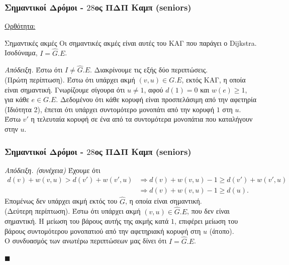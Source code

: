 \documentclass[t]{beamer}
\begin{document}
\begin{frame}
	\frametitle{Σημαντικοί Δρόμοι - $28$ος ΠΔΠ Καμπ (seniors)}
	\underline{Ορθότητα:}
	\pause
	\begin{block}{Σημαντικές ακμές}
		Οι σημαντικές ακμές είναι αυτές του ΚΑΓ που παράγει ο Dijkstra. Ισοδύναμα, $I = \hat{G}.E$.
	\end{block}
	\pause
	\begin{block}{\emph{Απόδειξη.}}
		Έστω ότι $I \neq \hat{G}.E$. Διακρίνουμε τις εξής δύο περιπτώσεις. 
		\pause
		\\
		\vspace{0.25cm} 
		(Πρώτη περίπτωση). Έστω ότι υπάρχει ακμή $(v, u) \in G.E$, εκτός ΚΑΓ, η οποία είναι σημαντική. 
		Γνωρίζουμε σίγουρα ότι $u \neq 1$, αφού $d(1) = 0$ και $w(e) \geq 1$, για κάθε $e \in G.E$.
		Δεδομένου ότι κάθε κορυφή είναι προσπελάσιμη από την αφετηρία (Ιδιότητα 2), έπεται ότι υπάρχει 
		συντομότερο μονοπάτι από την κορυφή $1$ στη $u$. Έστω $v'$ η τελευταία κορυφή σε ένα από τα συντομότερα μονοπάτια 
		που καταλήγουν στην $u$.
	\end{block}
\end{frame}

\begin{frame}
	\frametitle{Σημαντικοί Δρόμοι - $28$ος ΠΔΠ Καμπ (seniors)}
	\begin{block}{\emph{Απόδειξη. (συνέχεια)}}
		 Έχουμε ότι 
		 \pause
		\begin{align*}
			d(v) + w(v, u) > d(v') + w(v', u) &\Rightarrow d(v) + w(v, u) - 1 \geq d(v') + w(v', u) \\ %
			&\Rightarrow d(v) + w(v, u) - 1 \geq d(u).
		\end{align*}
		\pause
		Επομένως δεν υπάρχει ακμή εκτός του $\hat{G}$, η οποία είναι σημαντική.
		\pause
		\\
		\vspace{0.25cm} 
		(Δεύτερη περίπτωση). Έστω ότι υπάρχει ακμή $(v, u) \in \hat{G}.E$, που δεν είναι σημαντική. Η μείωση του βάρους αυτής της ακμής κατά $1$, επιφέρει
		μείωση του βάρους συντομότερου μονοπατιού από την αφετηριακή κορυφή στη $u$ (άτοπο). 
		\pause
		\\
		\vspace{0.25cm} 
		Ο συνδυασμός των ανωτέρω περιπτώσεων μας δίνει ότι $I  = \hat{G}.E$.
		\begin{flushright}
			$\blacksquare$
		\end{flushright}
	\end{block}
\end{frame}
\end{document}
